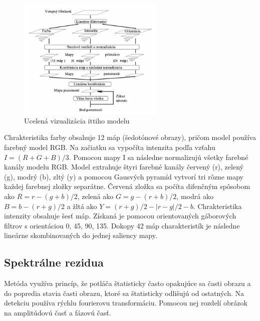 \begin{figure}[H]
 \centering
 \includegraphics[width=7cm]{pics/itti-1-svk.png}
 \caption{Ucelená vizualizácia ittiho modelu\cite{itty-98}}\label{wrap-fig:1}
\end{figure}
\vspace{10mm}

Chrakteristika farby obsahuje 12 máp (šedotónové obrazy), pričom model používa farebný model RGB.
Na začiatku sa vypočíta intenzita podľa vzťahu \begin{math} I = (R+G+B)/3\end{math}.
Pomocou mapy I sa následne normalizujú všetky farebné kanály modelu RGB.
Model extrahuje štyri farebné kanály červený (r), zelený (g), modrý (b), zltý (y) a pomocou Gausvých pyramíd vytvorí tri rôzne mapy každej farebnej zložky separátne.
Červená zložka sa počíta difenčným spôsobom ako \begin{math} R = r - (g + b)/2 \end{math}, zelená ako \begin{math} G = g - (r + b)/2 \end{math}, modrá ako \begin{math}B = b - (r + g)/2\end{math} a žltá ako \begin{math}Y = (r + g)/2 - |r - g|/2 - b\end{math}.
Chrakteristika intenzity obsahuje šesť máp.
Získaná je pomocou orientovaných gáborových filtrov s orientáciou 0\degree, 45\degree, 90\degree, 135\degree.
Dokopy 42 máp charakteristík je následne lineárne skombinovaných do jednej saliency mapy\cite{itty-98}.


\subsection{Spektrálne rezidua}
Metóda využíva princíp, že potláča štatisticky často opakujúce sa časti obrazu a do popredia stavia časti obrazu, ktoré sa štatisticky odlišujú od ostatných.
Na detekciu používa rýchlu fourierovu transformáciu.
Pomocou nej rozdelí obrázok na amplitúdovú časť a fázovú časť.

